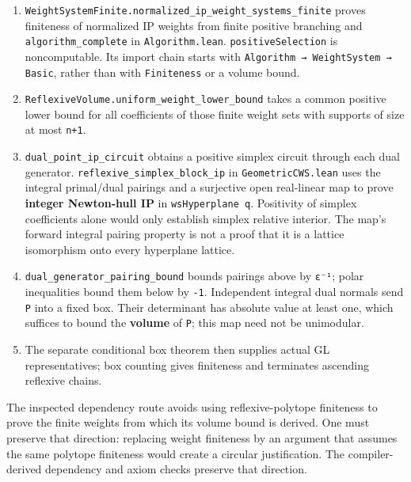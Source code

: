 \documentclass[11pt,a4paper,oneside]{report}
\providecommand{\tightlist}{%
  \setlength{\itemsep}{0pt}\setlength{\parskip}{0pt}}
\begin{document}
\begin{enumerate}
\def\labelenumi{\arabic{enumi}.}
\tightlist
\item
  \texttt{WeightSy\allowbreak{}stemFini\allowbreak{}te.\allowbreak{}normaliz\allowbreak{}ed\_\allowbreak{}ip\_\allowbreak{}weight\_\allowbreak{}systems\_\allowbreak{}finite}
  proves finiteness of normalized IP weights from finite positive
  branching and \texttt{algorith\allowbreak{}m\_\allowbreak{}complete}
  in \texttt{Algorith\allowbreak{}m.\allowbreak{}lean}.
  \texttt{positive\allowbreak{}Selectio\allowbreak{}n} is noncomputable.
  Its import chain starts with
  \texttt{Algorith\allowbreak{}m → WeightSy\allowbreak{}stem → Basic},
  rather than with \texttt{Finitene\allowbreak{}ss} or a volume bound.
\item
  \texttt{Reflexiv\allowbreak{}eVolume.\allowbreak{}uniform\_\allowbreak{}weight\_\allowbreak{}lower\_\allowbreak{}bound}
  takes a common positive lower bound for all coefficients of those
  finite weight sets with supports of size at most \texttt{n+1}.
\item
  \texttt{dual\_\allowbreak{}point\_\allowbreak{}ip\_\allowbreak{}circuit}
  obtains a positive simplex circuit through each dual generator.
  \texttt{reflexiv\allowbreak{}e\_\allowbreak{}simplex\_\allowbreak{}block\_\allowbreak{}ip}
  in \texttt{Geometri\allowbreak{}cCWS.\allowbreak{}lean} uses the
  integral primal/dual pairings and a surjective open real-linear map to
  prove \textbf{integer Newton-hull IP} in
  \texttt{wsHyperp\allowbreak{}lane q}. Positivity of simplex
  coefficients alone would only establish simplex relative interior. The
  map's forward integral pairing property is not a proof that it is a
  lattice isomorphism onto every hyperplane lattice.
\item
  \texttt{dual\_\allowbreak{}generato\allowbreak{}r\_\allowbreak{}pairing\_\allowbreak{}bound}
  bounds pairings above by \texttt{ε⁻¹}; polar inequalities bound them
  below by \texttt{-\allowbreak{}1}. Independent integral dual normals
  send \texttt{P} into a fixed box. Their determinant has absolute value
  at least one, which suffices to bound the \textbf{volume} of
  \texttt{P}; this map need not be unimodular.
\item
  The separate conditional box theorem then supplies actual GL
  representatives; box counting gives finiteness and terminates
  ascending reflexive chains.
\end{enumerate}

The inspected dependency route avoids using reflexive-polytope
finiteness to prove the finite weights from which its volume bound is
derived. One must preserve that direction: replacing weight finiteness
by an argument that assumes the same polytope finiteness would create a
circular justification. The compiler-derived dependency and axiom checks
preserve that direction.
\end{document}
